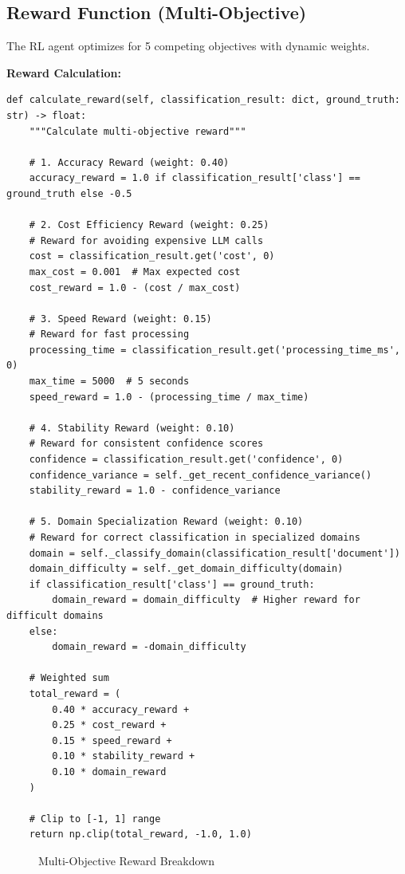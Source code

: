 \subsection{Reward Function (Multi-Objective)}

The RL agent optimizes for 5 competing objectives with dynamic weights.

\textbf{Reward Calculation:}
\begin{lstlisting}[style=pythonstyle]
def calculate_reward(self, classification_result: dict, ground_truth: str) -> float:
    """Calculate multi-objective reward"""
    
    # 1. Accuracy Reward (weight: 0.40)
    accuracy_reward = 1.0 if classification_result['class'] == ground_truth else -0.5
    
    # 2. Cost Efficiency Reward (weight: 0.25)
    # Reward for avoiding expensive LLM calls
    cost = classification_result.get('cost', 0)
    max_cost = 0.001  # Max expected cost
    cost_reward = 1.0 - (cost / max_cost)
    
    # 3. Speed Reward (weight: 0.15)
    # Reward for fast processing
    processing_time = classification_result.get('processing_time_ms', 0)
    max_time = 5000  # 5 seconds
    speed_reward = 1.0 - (processing_time / max_time)
    
    # 4. Stability Reward (weight: 0.10)
    # Reward for consistent confidence scores
    confidence = classification_result.get('confidence', 0)
    confidence_variance = self._get_recent_confidence_variance()
    stability_reward = 1.0 - confidence_variance
    
    # 5. Domain Specialization Reward (weight: 0.10)
    # Reward for correct classification in specialized domains
    domain = self._classify_domain(classification_result['document'])
    domain_difficulty = self._get_domain_difficulty(domain)
    if classification_result['class'] == ground_truth:
        domain_reward = domain_difficulty  # Higher reward for difficult domains
    else:
        domain_reward = -domain_difficulty
    
    # Weighted sum
    total_reward = (
        0.40 * accuracy_reward +
        0.25 * cost_reward +
        0.15 * speed_reward +
        0.10 * stability_reward +
        0.10 * domain_reward
    )
    
    # Clip to [-1, 1] range
    return np.clip(total_reward, -1.0, 1.0)
\end{lstlisting}

\begin{figure}[h]
\centering
{}
\caption{Multi-Objective Reward Breakdown}
\label{fig:rl-reward-breakdown}
\end{figure}

